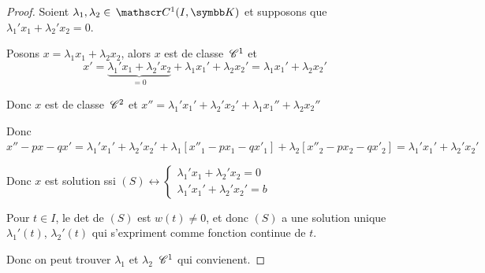 \begin{proof}
    Soient $\lambda_1, \lambda_2 \in \mc 1(I, \K)$ et supposons que 
    $\lambda_1' x_1 + \lambda_2' x_2 = 0$. 

    Posons $x = \lambda_1 x_1 + \lambda_2 x_2$, alors $x$ est de classe $\,\mathscr C^{1}$ et 
    $$x' = \underbrace{\lambda_1' x_1 + \lambda_2' x_2}_{ = 0} + \lambda_1 x_1' + \lambda_2 x_2' = \lambda_1 x_1' + \lambda_2 x_2'$$

    Donc $x$ est de classe $\,\mathscr C^{2}$ et $x'' = \lambda_1' x_1' + \lambda_2' x_2' + \lambda_1 x_1'' + \lambda_2 x_2''$

    Donc $x'' - px - qx' = \lambda_1' x_1' + \lambda_2' x_2' + \lambda_1 [x''_1 - px_1 - qx'_1] + \lambda_2[x''_2 - px_2 - qx'_2] = \lambda_1' x_1' + \lambda_2' x_2' $

    Donc $x$ est solution ssi $(S) \leftrightarrow \begin{cases}
        \lambda_1' x_1 + \lambda_2' x_2 = 0 \\
        \lambda_1' x_1' + \lambda_2' x_2' = b
    \end{cases}$

    Pour $t \in I$, le det de $(S)$ est $w(t) \neq 0$, et donc $(S)$ a une solution unique 
    $\lambda_1'(t)$, $\lambda_2'(t)$ qui s'expriment comme fonction continue de $t$. 

    Donc on peut trouver $\lambda_1$ et $\lambda_2$ $\,\mathscr C^{1}$ qui convienent.
\end{proof}

